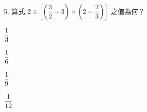 \documentclass[12pt]{article}
\begin{document}
\begin{problem}
  \item[5.] 算式 $2 \div \biggl[\biggl(\fraction{3}{2} + 3\biggr) \times \biggl(2 - \fraction{2}{3}\biggr)\biggr]$ 之值為何？
  \begin{choices}
    \item $\fraction{1}{3}$
    \item $\fraction{1}{6}$
    \item $\fraction{1}{9}$
    \item $\fraction{1}{12}$
  \end{choices}
\end{problem}
\end{document}
